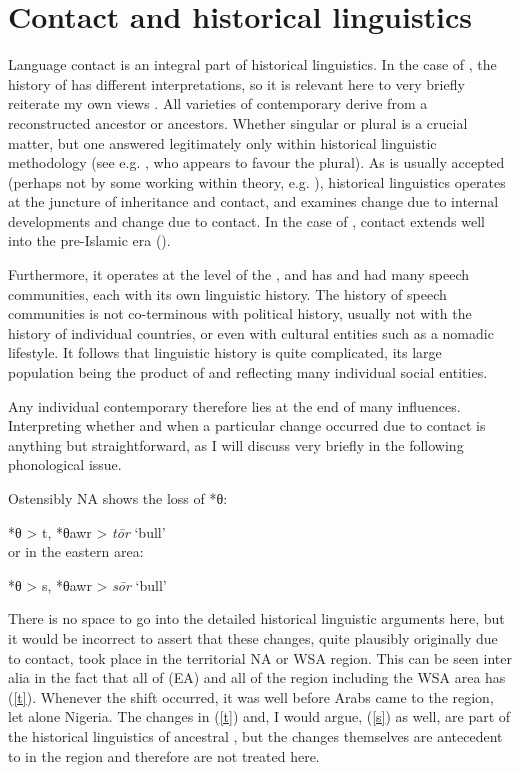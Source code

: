 \documentclass[output=paper]{langsci/langscibook}
\begin{document}
\section{Contact and historical linguistics
}


Language contact is an integral part of historical linguistics. In the case of , the history of  has different interpretations, so it is relevant here to very briefly reiterate my own views \citep{Owens2006}. All varieties of contemporary  derive from a reconstructed ancestor or ancestors. Whether singular or plural is a crucial matter, but one answered legitimately only within historical linguistic methodology (see e.g. \citealt{Retsö2013}, who appears to favour the plural). As is usually accepted (perhaps not by some working within  theory, e.g. \citealt{HeineKuteva2011}), historical linguistics operates at the juncture of inheritance and contact, and examines change due to internal developments and change due to contact. In the case of , contact extends well into the pre-Islamic era (\citealt{Owens2013,Owens2016Aramaic,Owensforthcoming}).

Furthermore, it operates at the level of the , and  has and had many speech communities, each with its own linguistic history. The history of speech communities is not co-terminous with political history, usually not with the history of individual countries, or even with cultural entities such as a nomadic lifestyle. It follows that  linguistic history is quite complicated, its large population being the product of and reflecting many individual social entities.


Any individual contemporary   therefore lies at the end of many influences. Interpreting whether and when a particular change occurred due to contact is anything but straightforward, as I will discuss very briefly in the following phonological issue.

Ostensibly NA shows the loss of *θ:

\ea\label{t}
*\textup{θ} > t, \textup{*}θawr > \textit{tōr}  \textup{‘bull’}\\
\z
  or in the eastern area:

\ea\label{s}
  *θ > s, \textup{*}θawr > \textit{sōr} \textup{‘bull’}\\
\z


There is no space to go into the detailed historical linguistic arguments here, but it would be incorrect to assert that these changes, quite plausibly originally due to contact, took place in the territorial NA or WSA region. This can be seen inter alia in the fact that all of   (EA) and all of the  region including the WSA area has (\ref{t}). Whenever the shift occurred, it was well before Arabs came to the  region, let alone Nigeria. The changes in (\ref{t}) and, I would argue, (\ref{s}) as well, are part of the historical linguistics of ancestral  , but the changes themselves are antecedent to  in the  region and therefore are not treated here.
\end{document}
